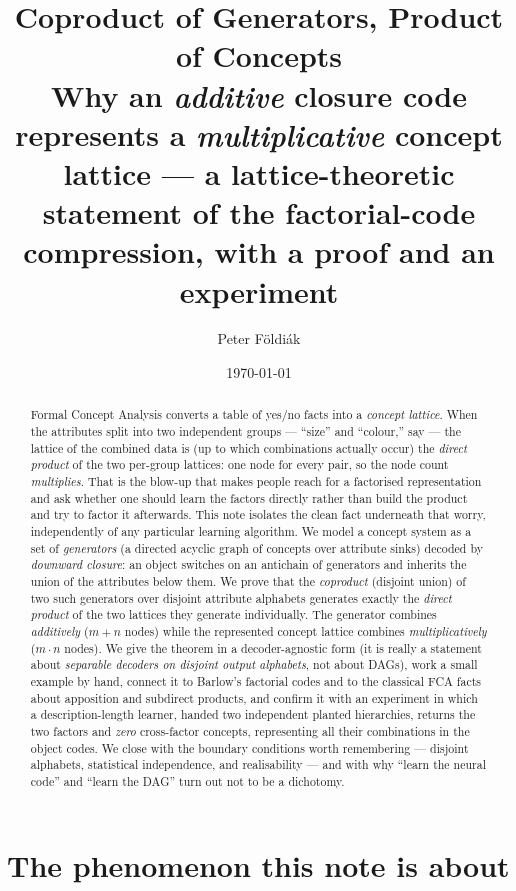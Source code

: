 \documentclass[11pt]{article}
\title{\bf Coproduct of Generators, Product of Concepts\\[3pt]
\large Why an \emph{additive} closure code represents a \emph{multiplicative}
concept lattice --- a lattice-theoretic statement of the factorial-code
compression, with a proof and an experiment}
\author{Peter F\"oldi\'ak}
\date{\today}
\theoremstyle{definition}
\theoremstyle{plain}
\theoremstyle{remark}
\begin{document}
\maketitle

\begin{abstract}
\noindent
Formal Concept Analysis converts a table of yes/no facts into a
\emph{concept lattice}. When the attributes split into two independent groups
--- ``size'' and ``colour,'' say --- the lattice of the combined data is (up to
which combinations actually occur) the \emph{direct product} of the two
per-group lattices: one node for every pair, so the node count \emph{multiplies}.
That is the blow-up that makes people reach for a factorised representation and
ask whether one should learn the factors directly rather than build the product
and try to factor it afterwards. This note isolates the clean fact underneath
that worry, independently of any particular learning algorithm. We model a
concept system as a set of \emph{generators} (a directed acyclic graph of
concepts over attribute sinks) decoded by \emph{downward closure}: an object
switches on an antichain of generators and inherits the union of the attributes
below them. We prove that the \emph{coproduct} (disjoint union) of two such
generators over disjoint attribute alphabets generates exactly the \emph{direct
product} of the two lattices they generate individually. The generator combines
\emph{additively} ($m+n$ nodes) while the represented concept lattice combines
\emph{multiplicatively} ($m\cdot n$ nodes). We give the theorem in a decoder-agnostic
form (it is really a statement about \emph{separable decoders on disjoint output
alphabets}, not about DAGs), work a small example by hand, connect it to
Barlow's factorial codes and to the classical FCA facts about apposition and
subdirect products, and confirm it with an experiment in which a
description-length learner, handed two independent planted hierarchies, returns
the two factors and \emph{zero} cross-factor concepts, representing all their
combinations in the object codes. We close with the boundary conditions worth
remembering --- disjoint alphabets, statistical independence, and realisability
--- and with why ``learn the neural code'' and ``learn the DAG'' turn out not to
be a dichotomy.
\end{abstract}

\tableofcontents

\section{The phenomenon this note is about}
\end{document}
